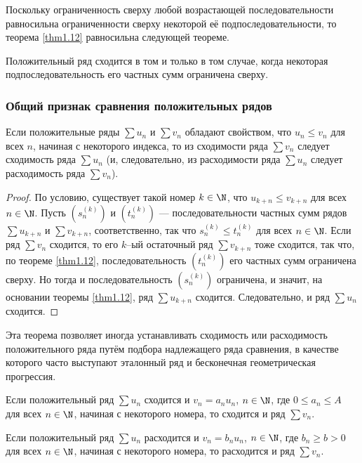 \documentclass[a4paper]{article}
\begin{document}
Поскольку ограниченность сверху любой возрастающей
последовательности равносильна ограниченности сверху некоторой её
подпоследовательности, то теорема \ref{thm1.12} равносильна
следующей теореме.

\begin{theorem}
Положительный ряд сходится в том и только в том случае, когда
некоторая подпоследовательность его частных сумм ограничена сверху.
\end{theorem}

\subsubsection{Общий признак сравнения положительных рядов}
\begin{theorem}
Если положительные ряды $\sum u_n$ и $\sum v_n$ обладают свойством,
что $u_n\le v_n$ для всех $n$, начиная с некоторого индекса, то из
сходимости ряда $\sum v_n$ следует сходимость ряда $\sum u_n$ (и,
следовательно, из расходимости ряда $\sum u_n$ следует расходимость
ряда $\sum v_n$).
\end{theorem}

\begin{proof}
По условию, существует такой номер $k\in\N$, что $u_{k+n} \le
v_{k+n}$ для всех $n\in\N$. Пусть $(s^{(k)}_n)$ и $(t^{(k)}_n)$
--- последовательности частных сумм рядов $\sum u_{k+n}$ и $\sum
v_{k+n}$, соответственно, так что $s^{(k)}_n \le t^{(k)}_n$ для всех
$n\in\N$. Если ряд $\sum v_n$ сходится, то его $k$--ый остаточный
ряд $\sum v_{k+n}$ тоже сходится, так что, по теореме \ref{thm1.12},
последовательность $(t^{(k)}_n)$ его частных сумм ограничена сверху.
Но тогда и последовательность $(s^{(k)}_n)$ ограничена, и значит, на
основании теоремы \ref{thm1.12}, ряд $\sum u_{k+n}$ сходится.
Следовательно, и ряд $\sum u_n$ сходится.
\end{proof}

Эта теорема позволяет иногда устанавливать сходимость или
расходимость положительного ряда путём подбора надлежащего  ряда
сравнения, в качестве которого часто выступают эталонный ряд и
бесконечная геометрическая прогрессия.

\begin{imp}\label{imp1.3}
Если положительный ряд $\sum u_n$ сходится и $v_n = a_n u_n$,
$n\in\N$, где $0 \le a_n \le A$ для всех $n\in\N$, начиная с
некоторого номера, то сходится и ряд $\sum v_n$.
\end{imp}

\begin{imp}\label{imp1.4}
Если положительный ряд $\sum u_n$ расходится и $v_n = b_n u_n$,
$n\in\N$, где $b_n \ge b > 0$ для всех $n\in\N$, начиная с
некоторого номера, то расходится и ряд $\sum v_n$.
\end{imp}
\end{document}
